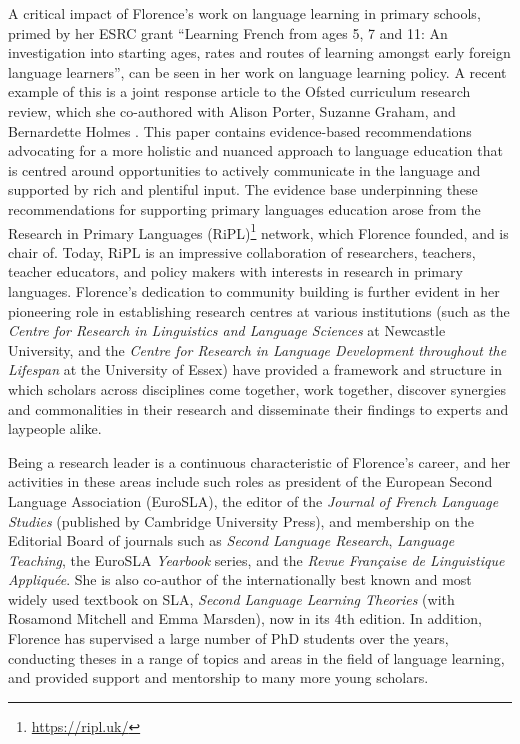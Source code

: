 \documentclass[output=paper]{langscibook}
\begin{document}
A critical impact of Florence’s work on language learning in primary schools, primed by her ESRC grant “Learning French from ages 5, 7 and 11: An investigation into starting ages, rates and routes of learning amongst early foreign language learners”, can be seen in her work on language learning policy. A recent example of this is a joint response article to the Ofsted curriculum research review, which she co-authored with Alison Porter, Suzanne Graham, and Bernardette Holmes \citep{PorterEtAl2022}. This paper contains evidence-based recommendations advocating for a more holistic and nuanced approach to language education that is centred around opportunities to actively communicate in the language and supported by rich and plentiful input. The evidence base underpinning these recommendations for supporting primary languages education arose from the Research in Primary Languages (RiPL)\footnote{\url{https://ripl.uk/}} network, which Florence founded, and is chair of. Today, RiPL is an impressive collaboration of researchers, teachers, teacher educators, and policy makers with interests in research in primary languages. Florence's dedication to community building is further evident in her pioneering role in establishing research centres at various institutions (such as the \textit{Centre for Research in Linguistics and Language Sciences} at Newcastle University, and the \textit{Centre for Research in Language Development throughout the Lifespan} at the University of Essex) have provided a framework and structure in which scholars across disciplines come together, work together, discover synergies and commonalities in their research and disseminate their findings to experts and laypeople alike.

Being a research leader is a continuous characteristic of Florence's career, and her activities in these areas include such roles as president of the European Second Language Association (EuroSLA), the editor of the \textit{Journal of French Language Studies} (published by Cambridge University Press), and membership on the Editorial Board of journals such as \textit{Second Language Research}, \textit{Language Teaching}, the EuroSLA \textit{Yearbook} series, and the \textit{Revue Française de Linguistique Appliquée}. She is also co-author of the internationally best known and most widely used textbook on SLA, \textit{Second Language Learning Theories} (with Rosamond Mitchell and Emma Marsden), now in its 4th edition. In addition, Florence has supervised a large number of PhD students over the years, conducting theses in a range of topics and areas in the field of language learning, and provided support and mentorship to many more young scholars. 
\end{document}
